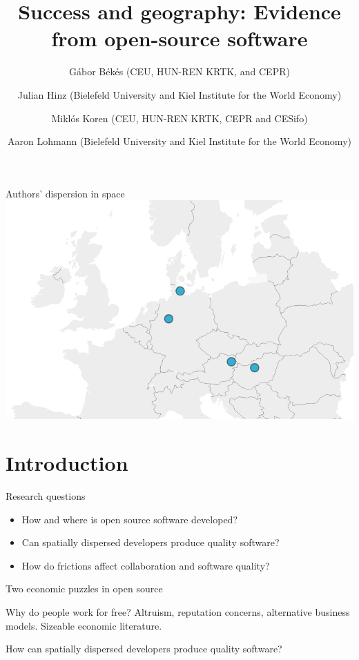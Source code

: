 \documentclass[
  ignorenonframetext,
  aspectratio=169,
]{beamer}
\title{Success and geography: Evidence from open-source software}
\author{Gábor Békés (CEU, HUN-REN KRTK, and CEPR) \and Julian Hinz
(Bielefeld University and Kiel Institute for the World
Economy) \and Miklós Koren (CEU, HUN-REN KRTK, CEPR and
CESifo) \and Aaron Lohmann (Bielefeld University and Kiel Institute for
the World Economy)}
\date{June 21, 2024\footnote<.->{This work was funded by the European
  Union under the Horizon Europe grant 101061123. Views and opinions
  expressed are, however, those of the author(s) only and do not
  necessarily reflect those of the European Union or the European
  Commission. Neither the European Union nor the granting authority can
  be held responsible for them.}}
\providecommand{\tightlist}{%
  \setlength{\itemsep}{0pt}\setlength{\parskip}{0pt}}
\begin{document}
\frame{\titlepage}

\begin{frame}{Authors' dispersion in space}
\protect\hypertarget{authors-dispersion-in-space}{}
\includegraphics{images/authors-space.png}
\end{frame}

\section{Introduction}\label{introduction}

\begin{frame}{Research questions}
\protect\hypertarget{research-questions}{}
\begin{itemize}
\tightlist
\item
  How and where is open source software developed?
\item
  Can spatially dispersed developers produce quality software?
\item
  How do frictions affect collaboration and software quality?
\end{itemize}
\end{frame}

\begin{frame}{Two economic puzzles in open source}
\protect\hypertarget{two-economic-puzzles-in-open-source}{}
\begin{block}{Why do people work for free?}
\protect\hypertarget{why-do-people-work-for-free}{}
Altruism, reputation concerns, alternative business models. Sizeable
economic literature.
\end{block}

\begin{block}{How can spatially dispersed developers produce quality
software?}
\protect\hypertarget{how-can-spatially-dispersed-developers-produce-quality-software}{}
\end{block}
\end{frame}
\end{document}
